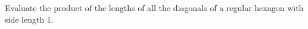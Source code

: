 Evaluate the product of the lengths of all the diagonals of a regular hexagon with side length $1$.
